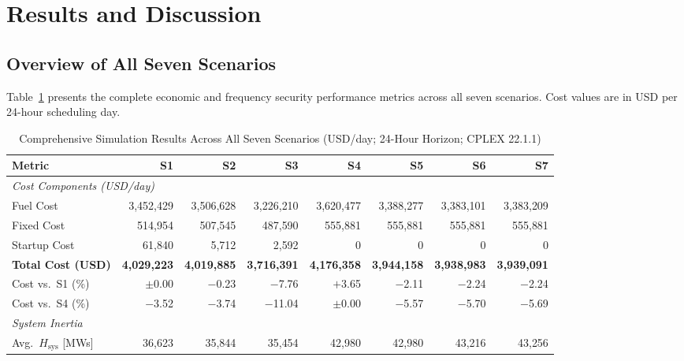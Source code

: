 \documentclass[journal]{IEEEtran}
\begin{document}
\section{Results and Discussion}
\label{sec:results}

\subsection{Overview of All Seven Scenarios}

Table~\ref{tab:results} presents the complete economic and
frequency security performance metrics across all seven scenarios.
Cost values are in USD per 24-hour scheduling day.

\begin{table}[!t]
\renewcommand{\arraystretch}{1.3}
\caption{Comprehensive Simulation Results Across All Seven Scenarios
(USD/day; 24-Hour Horizon; CPLEX 22.1.1)}
\label{tab:results}
\centering\small
\begin{tabular}{lrrrrrrr}
\toprule
\textbf{Metric} & \textbf{S1} & \textbf{S2} & \textbf{S3}
  & \textbf{S4} & \textbf{S5} & \textbf{S6} & \textbf{S7} \\
\midrule
\multicolumn{8}{l}{\textit{Cost Components (USD/day)}} \\
Fuel Cost         & 3{,}452{,}429 & 3{,}506{,}628 & 3{,}226{,}210
  & 3{,}620{,}477 & 3{,}388{,}277 & 3{,}383{,}101 & 3{,}383{,}209 \\
Fixed Cost        &   514{,}954 &   507{,}545 &   487{,}590
  &   555{,}881 &   555{,}881 &   555{,}881 &   555{,}881 \\
Startup Cost      &    61{,}840 &     5{,}712 &     2{,}592
  &           0 &           0 &           0 &           0 \\
\textbf{Total Cost (USD)} & \textbf{4{,}029{,}223} & \textbf{4{,}019{,}885}
  & \textbf{3{,}716{,}391} & \textbf{4{,}176{,}358} & \textbf{3{,}944{,}158}
  & \textbf{3{,}938{,}983} & \textbf{3{,}939{,}091} \\
\midrule
Cost vs.\ S1 (\%)  & $\pm$0.00 & $-$0.23 & $-$7.76 & $+$3.65
  & $-$2.11 & $-$2.24 & $-$2.24 \\
Cost vs.\ S4 (\%)  & $-$3.52 & $-$3.74 & $-$11.04 & $\pm$0.00
  & $-$5.57 & $-$5.70 & $-$5.69 \\
\midrule
\multicolumn{8}{l}{\textit{System Inertia}} \\
Avg.\ $H_{\text{sys}}$ [MWs] & 36{,}623 & 35{,}844 & 35{,}454
  & 42{,}980 & 42{,}980 & 43{,}216 & 43{,}256 \\

\end{tabular}
\end{table}
\end{document}
